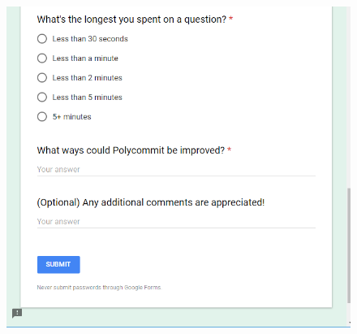 \begin{figure}[h!]
	\includegraphics[width=1.0\linewidth]{figures/survey3}
	\caption{}
	\label{fig:survey3}
\end{figure}
